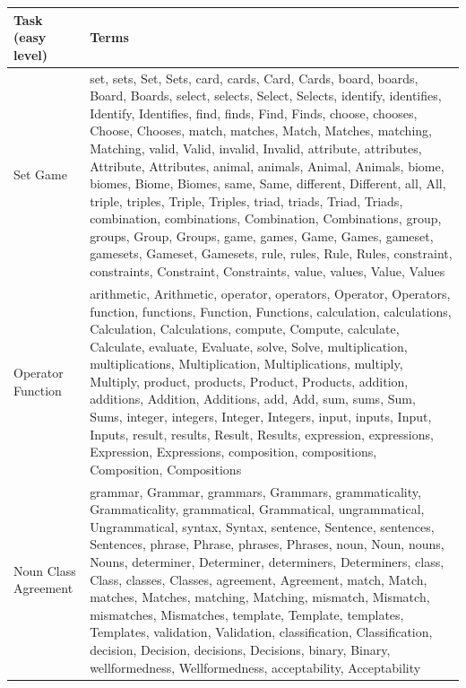 \begin{footnotesize}
\begin{tabular}{@{}lp{}@{}}
\toprule
Task (easy level) & Terms \\
\midrule
Set Game & set, sets, Set, Sets, card, cards, Card, Cards, board, boards, Board, Boards, select, selects, Select, Selects, identify, identifies, Identify, Identifies, find, finds, Find, Finds, choose, chooses, Choose, Chooses, match, matches, Match, Matches, matching, Matching, valid, Valid, invalid, Invalid, attribute, attributes, Attribute, Attributes, animal, animals, Animal, Animals, biome, biomes, Biome, Biomes, same, Same, different, Different, all, All, triple, triples, Triple, Triples, triad, triads, Triad, Triads, combination, combinations, Combination, Combinations, group, groups, Group, Groups, game, games, Game, Games, gameset, gamesets, Gameset, Gamesets, rule, rules, Rule, Rules, constraint, constraints, Constraint, Constraints, value, values, Value, Values \\[2pt]
Operator Function & arithmetic, Arithmetic, operator, operators, Operator, Operators, function, functions, Function, Functions, calculation, calculations, Calculation, Calculations, compute, Compute, calculate, Calculate, evaluate, Evaluate, solve, Solve, multiplication, multiplications, Multiplication, Multiplications, multiply, Multiply, product, products, Product, Products, addition, additions, Addition, Additions, add, Add, sum, sums, Sum, Sums, integer, integers, Integer, Integers, input, inputs, Input, Inputs, result, results, Result, Results, expression, expressions, Expression, Expressions, composition, compositions, Composition, Compositions \\[2pt]
Noun Class Agreement & grammar, Grammar, grammars, Grammars, grammaticality, Grammaticality, grammatical, Grammatical, ungrammatical, Ungrammatical, syntax, Syntax, sentence, Sentence, sentences, Sentences, phrase, Phrase, phrases, Phrases, noun, Noun, nouns, Nouns, determiner, Determiner, determiners, Determiners, class, Class, classes, Classes, agreement, Agreement, match, Match, matches, Matches, matching, Matching, mismatch, Mismatch, mismatches, Mismatches, template, Template, templates, Templates, validation, Validation, classification, Classification, decision, Decision, decisions, Decisions, binary, Binary, wellformedness, Wellformedness, acceptability, Acceptability \\[2pt]

\end{tabular}
\end{footnotesize}
